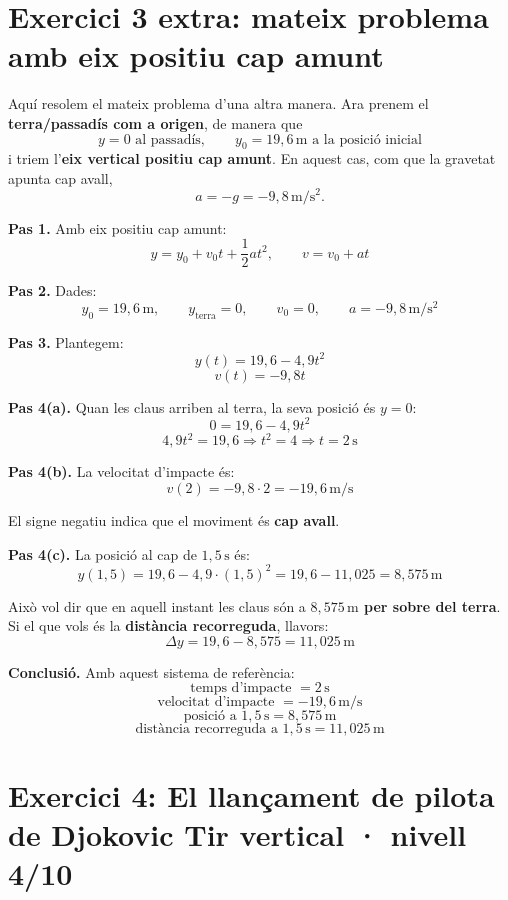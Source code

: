 \documentclass[11pt,a4paper]{article}
\begin{document}
\clearpage

\section*{Exercici 3 extra: mateix problema amb eix positiu cap amunt}

Aquí resolem el mateix problema d'una altra manera. Ara prenem el \textbf{terra/passadís com a origen}, de manera que
\[
y=0 \text{ al passadís}, \qquad y_0=19{,}6\,\mathrm{m} \text{ a la posició inicial}
\]
i triem l'\textbf{eix vertical positiu cap amunt}. En aquest cas, com que la gravetat apunta cap avall,
\[
a=-g=-9{,}8\,\mathrm{m/s^2}.
\]

\begin{solutionbox}
\textbf{Pas 1.} Amb eix positiu cap amunt:
\[
y=y_0+v_0t+\frac{1}{2}at^2, \qquad v=v_0+at
\]

\textbf{Pas 2.} Dades:
\[
y_0=19{,}6\,\mathrm{m}, \qquad y_{\text{terra}}=0, \qquad v_0=0, \qquad a=-9{,}8\,\mathrm{m/s^2}
\]

\textbf{Pas 3.} Plantegem:
\[
y(t)=19{,}6-4{,}9t^2
\]
\[
v(t)=-9{,}8t
\]

\textbf{Pas 4(a).} Quan les claus arriben al terra, la seva posició és $y=0$:
\[
0=19{,}6-4{,}9t^2
\]
\[
4{,}9t^2=19{,}6 \Longrightarrow t^2=4 \Longrightarrow t=2\,\mathrm{s}
\]

\textbf{Pas 4(b).} La velocitat d'impacte és:
\[
v(2)= -9{,}8\cdot 2=-19{,}6\,\mathrm{m/s}
\]

El signe negatiu indica que el moviment és \textbf{cap avall}.

\textbf{Pas 4(c).} La posició al cap de $1{,}5\,\mathrm{s}$ és:
\[
y(1{,}5)=19{,}6-4{,}9\cdot (1{,}5)^2=19{,}6-11{,}025=8{,}575\,\mathrm{m}
\]

Això vol dir que en aquell instant les claus són a \textbf{$8{,}575\,\mathrm{m}$ per sobre del terra}. Si el que vols és la \textbf{distància recorreguda}, llavors:
\[
\Delta y = 19{,}6-8{,}575=11{,}025\,\mathrm{m}
\]

\textbf{Conclusió.} Amb aquest sistema de referència:
\[
\text{temps d'impacte } = 2\,\mathrm{s}
\]
\[
\text{velocitat d'impacte } = -19{,}6\,\mathrm{m/s}
\]
\[
\text{posició a }1{,}5\,\mathrm{s} = 8{,}575\,\mathrm{m}
\]
\[
\text{distància recorreguda a }1{,}5\,\mathrm{s} = 11{,}025\,\mathrm{m}
\]
\end{solutionbox}

\clearpage

\section*{Exercici 4: El llançament de pilota de Djokovic \hfill \normalfont Tir vertical · nivell 4/10}
\end{document}
